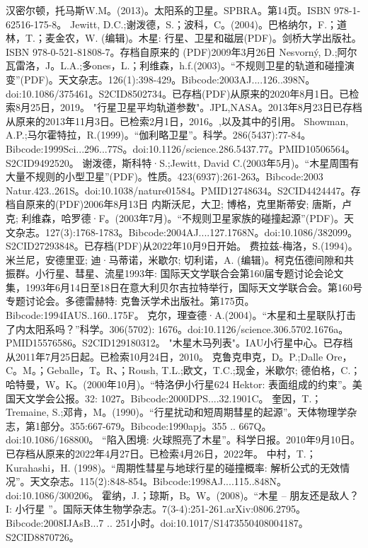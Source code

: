 \begin{enumerate}
 汉密尔顿，托马斯W.M。(2013)。太阳系的卫星。SPBRA。第14页。ISBN 978-1-62516-175-8。
 Jewitt, D.C.;谢泼德，S.；波科，C。(2004)。巴格纳尔，F.；道林，T.；麦金农，W. (编辑)。木星: 行星、卫星和磁层(PDF)。剑桥大学出版社。ISBN  978-0-521-81808-7。存档自原来的 (PDF)2009年3月26日
 Nesvorný, D.;阿尔瓦雷洛，J。L.A.;多ones，L.；利维森，h.f.(2003)。“不规则卫星的轨道和碰撞演变”(PDF)。天文杂志。126(1):398-429。Bibcode:2003AJ....126..398N。doi:10.1086/375461。S2CID8502734。已存档(PDF)从原来的2020年8月1日。已检索8月25日，2019。  
 "行星卫星平均轨道参数"。JPL,NASA。2013年8月23日已存档从原来的2013年11月3日。已检索2月1日，2016。,以及其中的引用。
 Showman, A.P.;马尔霍特拉，R.(1999)。“伽利略卫星”。科学。286(5437):77-84。Bibcode:1999Sci...296...77S。doi:10.1126/science.286.5437.77。PMID10506564。S2CID9492520。  
 谢泼德，斯科特·S.;Jewitt, David C.(2003年5月)。“木星周围有大量不规则的小型卫星”(PDF)。性质。423(6937):261-263。Bibcode:2003 Natur.423..261S。doi:10.1038/nature01584。PMID12748634。S2CID4424447。存档自原来的(PDF)2006年8月13日   
 内斯沃尼，大卫; 博格，克里斯蒂安; 唐斯，卢克; 利维森，哈罗德·F。(2003年7月)。“不规则卫星家族的碰撞起源”(PDF)。天文杂志。127(3):1768-1783。Bibcode:2004AJ....127.1768N。doi:10.1086/382099。S2CID27293848。已存档(PDF)从2022年10月9日开始。  
 费拉兹-梅洛，S.(1994)。米兰尼，安德里亚; 迪·马蒂诺，米歇尔; 切利诺，A. (编辑)。柯克伍德间隙和共振群。小行星、彗星、流星1993年: 国际天文学联合会第160届专题讨论会论文集，1993年6月14日至18日在意大利贝尔吉拉特举行，国际天文学联合会。第160号专题讨论会。多德雷赫特: 克鲁沃学术出版社。第175页。Bibcode:1994IAUS..160..175F。
 克尔，理查德·A.(2004)。“木星和土星联队打击了内太阳系吗？”科学。306(5702): 1676。doi:10.1126/science.306.5702.1676a。PMID15576586。S2CID129180312。  
 "木星木马列表"。IAU小行星中心。已存档从2011年7月25日起。已检索10月24日，2010。
 克鲁克申克，D。P.;Dalle Ore，C。M。；Geballe，T。R、；Roush, T.L.;欧文，T.C.;现金，米歇尔; 德伯格，C.；哈特曼，W。K。(2000年10月)。“特洛伊小行星624 Hektor: 表面组成的约束”。美国天文学会公报。32: 1027。Bibcode:2000DPS....32.1901C。
 奎因，T.；Tremaine, S.;邓肯，M。(1990)。“行星扰动和短周期彗星的起源”。天体物理学杂志，第1部分。355:667-679。Bibcode:1990apj。355 .. 667Q。doi:10.1086/168800。
 “陷入困境: 火球照亮了木星”。科学日报。2010年9月10日。已存档从原来的2022年4月27日。已检索4月26日，2022年。
 中村，T.；Kurahashi，H. (1998)。“周期性彗星与地球行星的碰撞概率: 解析公式的无效情况”。天文杂志。115(2):848-854。Bibcode:1998AJ....115..848N。doi:10.1086/300206。
 霍纳，J.；琼斯，B。W。(2008)。“木星 -- 朋友还是敌人？I: 小行星 ”。国际天体生物学杂志。7(3-4):251-261.arXiv:0806.2795。Bibcode:2008IJAsB...7 .. 251小时。doi:10.1017/S1473550408004187。S2CID8870726。 

\end{enumerate}
